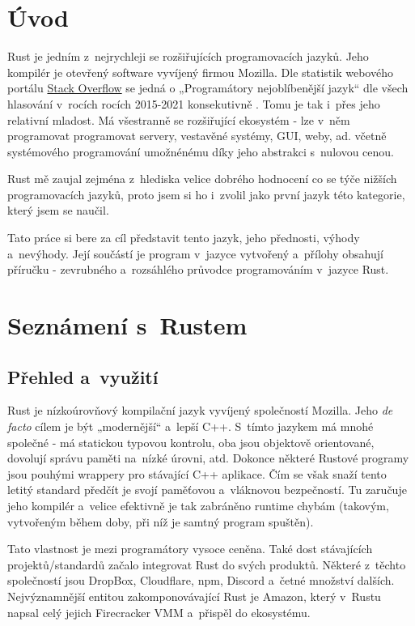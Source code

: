 \documentclass[a4paper, 12pt, twoside]{article} %
\begin{document}
\tableofcontents

\newpage


\section*{Úvod}
	Rust je jedním z~nejrychleji se rozšiřujících programovacích jazyků. Jeho kompilér je otevřený software vyvíjený firmou Mozilla. Dle statistik webového portálu \href{https://stackoverflow.com/}{Stack Overflow} se jedná o  „Programátory nejoblíbenější jazyk“ dle všech hlasování v~rocích rocích 2015-2021 konsekutivně \cite{stack}. Tomu je tak i~přes jeho relativní mladost. Má všestranně se rozšiřující ekosystém - lze v~něm programovat programovat servery, vestavěné systémy, GUI, weby, ad. včetně systémového programování umožnénému díky jeho abstrakci s~nulovou cenou.

	Rust mě zaujal zejména z~hlediska velice dobrého hodnocení co se týče nižších programovacích jazyků, proto jsem si ho i~zvolil jako první jazyk této kategorie, který jsem se naučil.
	
	Tato práce si bere za cíl představit tento jazyk, jeho přednosti, výhody a~nevýhody. Její součástí je program v~jazyce vytvořený a~přílohy obsahují příručku - zevrubného a~rozsáhlého průvodce programováním v~jazyce Rust.

\section*{Seznámení s~Rustem}
	\subsection{Přehled a~využití}
		Rust je nízkoúrovňový kompilační jazyk vyvíjený společností Mozilla. Jeho \textit{de facto} cílem je být „modernější“ a~lepší C++. S~tímto jazykem má mnohé společné - má statickou typovou kontrolu, oba jsou objektově orientované, dovolují správu paměti na~nízké úrovni, atd. Dokonce některé Rustové programy jsou pouhými wrappery pro stávající C++ aplikace. Čím se však snaží tento letitý standard předčít je svojí paměťovou a~vláknovou bezpečností. Tu zaručuje jeho kompilér a~velice efektivně je tak zabráněno runtime chybám (takovým, vytvořeným během doby, při níž je samtný program spuštěn). 

		Tato vlastnost je mezi programátory vysoce ceněna. Také dost stávajících projektů/standardů začalo integrovat Rust do svých produktů. Některé z~těchto společností jsou DropBox\cite{dropbox}, Cloudflare\cite{cloudflare}, npm\cite{npm}, Discord\cite{discord} a~četné množství dalších. Nejvýznamnější entitou zakomponovávající Rust je Amazon\cite{amazon}, který v~Rustu napsal celý jejich Firecracker VMM a~přispěl do ekosystému.
\end{document}
